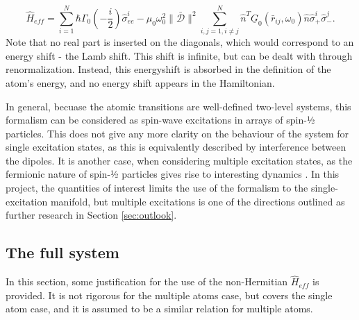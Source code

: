 \documentclass{article}
\begin{document}
\begin{equation}
    \hat{H}_{eff} = \sum_{i=1}^N \hbar \Gamma_0 \left( - \frac{i}{2} \right) \hat{\sigma}_{ee}^i -\mu_0 \omega_0^2 \|\bar{\mathscr{D}}\|^2 \sum_{i,j = 1, i \neq j}^N \hat{n}^T \underline{G}_0(\bar{r}_{ij}, \omega_0) \hat{n} \hat{\sigma}_+^i \hat{\sigma}_-^j.
\end{equation}
Note that no real part is inserted on the diagonals, which would correspond to an energy shift - the Lamb shift. This shift is infinite, but can be dealt with through renormalization. Instead, this energyshift is absorbed in the definition of the atom's energy, and no energy shift appears in the Hamiltonian. 

In general, becuase the atomic transitions are well-defined two-level systems, this formalism can be considered as spin-wave excitations in arrays of spin-½ particles. This does not give any more clarity on the behaviour of the system for single excitation states, as this is equivalently described by interference between the dipoles. It is another case, when considering multiple excitation states, as the fermionic nature of spin-½ particles gives rise to interesting dynamics \cite[Section III.C]{Asenjo}. In this project, the quantities of interest limits the use of the formalism to the single-excitation manifold, but multiple excitations is one of the directions outlined as further research in Section \ref{sec:outlook}. 

\subsection{The full system}\label{sec:full_system}
In this section, some justification for the use of the non-Hermitian $\hat{H}_{eff}$ is provided. It is not rigorous for the multiple atoms case, but covers the single atom case, and it is assumed to be a similar relation for multiple atoms. 
\end{document}
